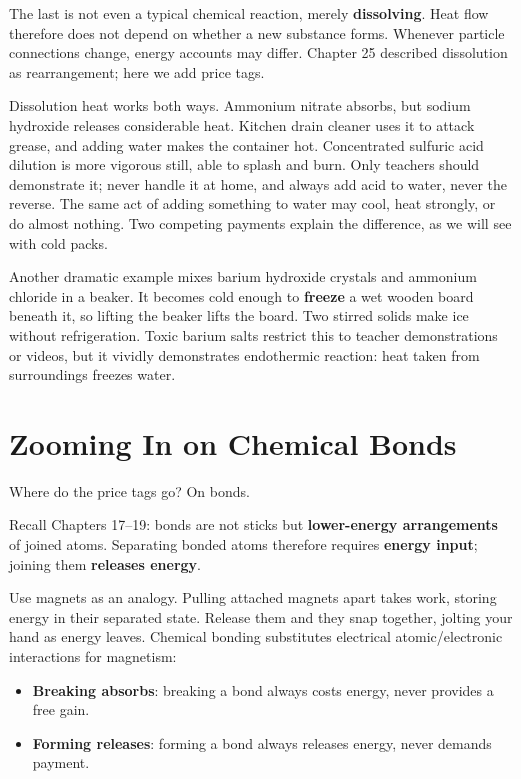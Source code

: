 The last is not even a typical chemical reaction, merely \textbf{dissolving}. Heat flow therefore does not depend on whether a new substance forms. Whenever particle connections change, energy accounts may differ. Chapter 25 described dissolution as rearrangement; here we add price tags.

Dissolution heat works both ways. Ammonium nitrate absorbs, but sodium hydroxide releases considerable heat. Kitchen drain cleaner uses it to attack grease, and adding water makes the container hot. Concentrated sulfuric acid dilution is more vigorous still, able to splash and burn. Only teachers should demonstrate it; never handle it at home, and always add acid to water, never the reverse. The same act of adding something to water may cool, heat strongly, or do almost nothing. Two competing payments explain the difference, as we will see with cold packs.

Another dramatic example mixes barium hydroxide crystals and ammonium chloride in a beaker. It becomes cold enough to \textbf{freeze} a wet wooden board beneath it, so lifting the beaker lifts the board. Two stirred solids make ice without refrigeration. Toxic barium salts restrict this to teacher demonstrations or videos, but it vividly demonstrates endothermic reaction: heat taken from surroundings freezes water.

\section{Zooming In on Chemical Bonds}

Where do the price tags go? On bonds.

Recall Chapters 17--19: bonds are not sticks but \textbf{lower-energy arrangements} of joined atoms. Separating bonded atoms therefore requires \textbf{energy input}; joining them \textbf{releases energy}.

Use magnets as an analogy. Pulling attached magnets apart takes work, storing energy in their separated state. Release them and they snap together, jolting your hand as energy leaves. Chemical bonding substitutes electrical atomic/electronic interactions for magnetism:

\begin{itemize}[itemsep=2pt]
\item \textbf{Breaking absorbs}: breaking a bond always costs energy, never provides a free gain.
\item \textbf{Forming releases}: forming a bond always releases energy, never demands payment.
\end{itemize}

